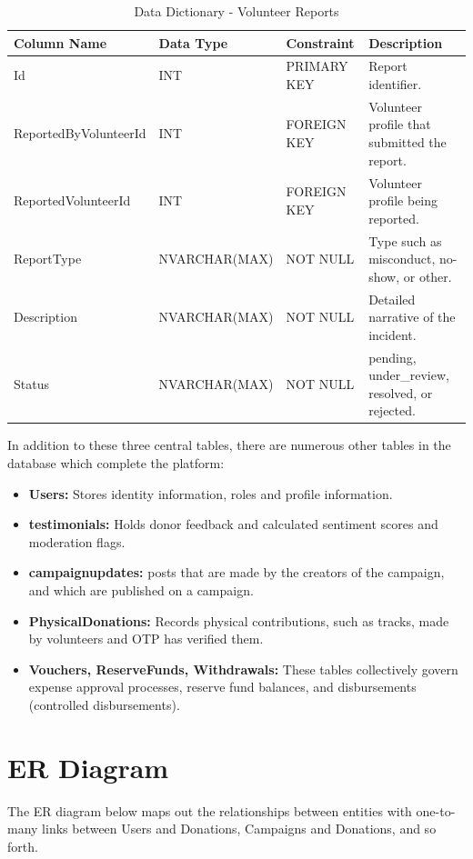 \documentclass{thesis-library}
\begin{document}
\begin{table}[H]
    \centering
    \caption{Data Dictionary - Volunteer Reports}
    \vspace{10pt}
    \begin{tabularx}{\linewidth}{|l|l|l|L|}
        \hline
        \textbf{Column Name} & \textbf{Data Type} & \textbf{Constraint} & \textbf{Description} \\
        \hline
        Id & INT & PRIMARY KEY & Report identifier. \\
        \hline
        ReportedByVolunteerId & INT & FOREIGN KEY & Volunteer profile that submitted the report. \\
        \hline
        ReportedVolunteerId & INT & FOREIGN KEY & Volunteer profile being reported. \\
        \hline
        ReportType & NVARCHAR(MAX) & NOT NULL & Type such as misconduct, no-show, or other. \\
        \hline
        Description & NVARCHAR(MAX) & NOT NULL & Detailed narrative of the incident. \\
        \hline
        Status & NVARCHAR(MAX) & NOT NULL & pending, under\_review, resolved, or rejected. \\
        \hline
    \end{tabularx}
\end{table}

In addition to these three central tables, there are numerous other tables in the database which complete the platform:
\begin{itemize}
    \item \textbf{Users:} Stores identity information, roles and profile information.
    \item \textbf{testimonials:} Holds donor feedback and calculated sentiment scores and moderation flags.
    \item \textbf{campaignupdates:} posts that are made by the creators of the campaign, and which are published on a campaign.
    \item \textbf{PhysicalDonations:} Records physical contributions, such as tracks, made by volunteers and OTP has verified them.
    \item \textbf{Vouchers, ReserveFunds, Withdrawals:} These tables collectively govern expense approval processes, reserve fund balances, and disbursements (controlled disbursements).
\end{itemize}

\section{ER Diagram}
The ER diagram below maps out the relationships between entities with one-to-many links between Users and Donations, Campaigns and Donations, and so forth.
\end{document}
